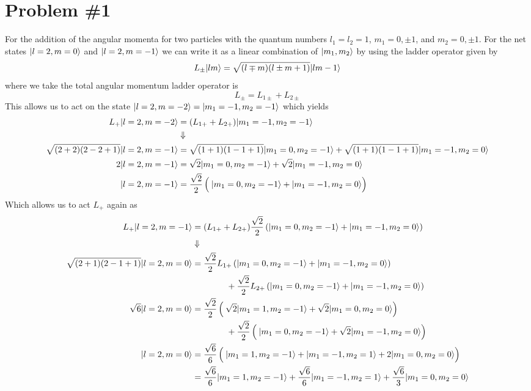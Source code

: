 \documentclass[11pt]{article}
\numberwithin{equation}{section}
\begin{document}


\section{Problem \#1}
For the addition of the angular momenta for two particles with the quantum numbers 
$l_1=l_2=1$, $m_1=0,\pm1$, and $m_2=0, \pm1$. For the net states $|{l=2,m=0}\rangle$ and
$|{l=2,m=-1}\rangle$ we can 
write it as a linear combination of $|{m_1,m_2}\rangle$ by using the ladder operator given by
$$L_{\pm}|{lm}\rangle = \sqrt{(l\mp{m})(l\pm{m}+1)}|{lm-1}\rangle$$ 
where we take the total angular momentum ladder operator is 
$$L_{\pm} = L_{1\pm}+L_{2\pm}$$
This allows us to act on the state $|{l=2,m=-2}\rangle = |{m_1=-1,m_2=-1}\rangle$ which yields
\begin{align*}
L_{+}|{l=2,m=-2}\rangle &= (L_{1+}+L_{2+})|{m_1=-1,m_2=-1}\rangle\\
&\Downarrow\\
\sqrt{(2+2)(2-2+1)}|{l=2,m=-1}\rangle &= \sqrt{(1+1)(1-1+1)}|{m_1=0,m_2=-1}\rangle + \sqrt{(1+1)(1-1+1)}|{m_1=-1,m_2=0}\rangle\\
2|{l=2,m=-1}\rangle &= \sqrt{2}|{m_1=0,m_2=-1}\rangle + \sqrt{2}|{m_1=-1,m_2=0}\rangle\\
|{l=2,m=-1}\rangle &= \frac{\sqrt{2}}{2}\left(\frac{}{}|{m_1=0,m_2=-1}\rangle + |{m_1=-1,m_2=0}\rangle\right)
\end{align*}
Which allows us to act $L_{+}$ again as
\begin{align*}
L_{+}|{l=2,m=-1}\rangle &= (L_{1+}+L_{2+})\frac{\sqrt{2}}{2}\left(|{m_1=0,m_2=-1}\rangle + |{m_1=-1,m_2=0}\rangle\right)\\
&\Downarrow\\
\sqrt{(2+1)(2-1+1)}|{l=2,m=0}\rangle &= \frac{\sqrt{2}}{2}L_{1+}\left(|{m_1=0,m_2=-1}\rangle + |{m_1=-1,m_2=0}\rangle\right)\\ 
&\qquad\qquad + \frac{\sqrt{2}}{2}L_{2+}\left(|{m_1=0,m_2=-1}\rangle + |{m_1=-1,m_2=0}\rangle\right)\\
\sqrt{6}|{l=2,m=0}\rangle &= \frac{\sqrt{2}}{2}\left(\frac{}{}\sqrt{2}|{m_1=1,m_2=-1}\rangle + \sqrt{2}|{m_1=0,m_2=0}\rangle\right)\\ 
&\qquad\qquad + \frac{\sqrt{2}}{2}\left(\frac{}{}|{m_1=0,m_2=-1}\rangle + \sqrt{2}|{m_1=-1,m_2=0}\rangle\right)\\
|{l=2,m=0}\rangle &= \frac{\sqrt{6}}{6}\left(\frac{}{}|{m_1=1,m_2=-1}\rangle + |{m_1=-1,m_2=1}\rangle + 2|{m_1=0,m_2=0}\rangle\right)\\
&= \frac{\sqrt{6}}{6}|{m_1=1,m_2=-1}\rangle + \frac{\sqrt{6}}{6}|{m_1=-1,m_2=1}\rangle + \frac{\sqrt{6}}{3}|{m_1=0,m_2=0}\rangle
\end{align*}
\end{document}
